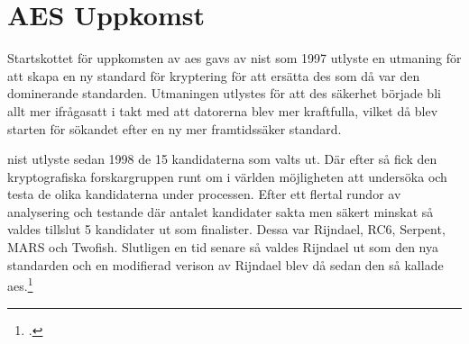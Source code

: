\section{AES Uppkomst} %
\label{sec:aes-uppkomst}
Startskottet för uppkomsten av \acrshort{aes} gavs av \acrfull{nist} som 1997
utlyste en utmaning för att skapa en ny standard för kryptering för att ersätta
\acrshort{des} som då var den dominerande standarden. Utmaningen utlystes för att
\acrshort{des} säkerhet började bli allt mer ifrågasatt i takt med att datorerna blev mer kraftfulla, vilket då blev starten för sökandet efter
en ny mer framtidssäker standard.

\acrshort{nist} utlyste sedan 1998 de 15 kandidaterna som valts ut. Där efter så fick
den kryptografiska forskargruppen runt om i världen möjligheten att undersöka och testa
de olika kandidaterna under processen. Efter ett flertal rundor av analysering och testande
där antalet kandidater sakta men säkert minskat så valdes tillslut 5 kandidater ut som
finalister. Dessa var Rijndael, RC6, Serpent, MARS och Twofish. Slutligen en tid senare så
valdes Rijndael ut som den nya standarden och en modifierad verison av Rijndael
blev då sedan den så kallade \acrfull{aes}.\footcite{nechvatal2001report}
